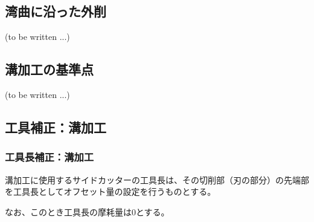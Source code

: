 \subsection{湾曲に沿った外削\TBW}
(to be written ...)


\clearpage


\subsection{溝加工の基準点\TBW}
(to be written ...)


\subsection{工具補正：溝加工}


\subsubsection{工具長補正：溝加工}
溝加工に使用するサイドカッターの工具長は、その切削部（刃の部分）の先端部を工具長としてオフセット量の設定を行うものとする。

なお、このとき工具長の摩耗量は0とする。


